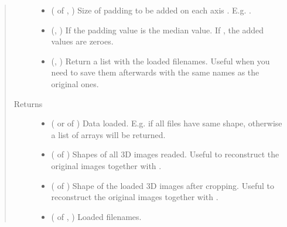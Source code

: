 \documentclass[letterpaper,10pt,english]{sphinxmanual}
\begin{document}
\begin{fulllineitems}
\begin{quote}
\begin{description}
\begin{itemize}
\item {} 
 ( of , ) \textendash{} Size of padding to be added on each axis . E.g. .

\item {} 
 (, ) \textendash{} If  the padding value is the median value. If , the added values are zeroes.

\item {} 
 (, ) \textendash{} Return a list with the loaded filenames. Useful when you need to save them afterwards with the same names as
the original ones.

\end{itemize}

\item[{Returns}] \leavevmode
\begin{itemize}
\item {} 
 ( or  of ) \textendash{} Data loaded. E.g.  if all files have same shape, otherwise a list of
 arrays will be returned.

\item {} 
 ( of ) \textendash{} Shapes of all 3D images readed. Useful to reconstruct the original images together with .

\item {} 
 ( of ) \textendash{} Shape of the loaded 3D images after cropping. Useful to reconstruct the original images together with
.

\item {} 
 ( of , ) \textendash{} Loaded filenames.


\end{itemize}
\end{description}
\end{quote}
\end{fulllineitems}
\end{document}
